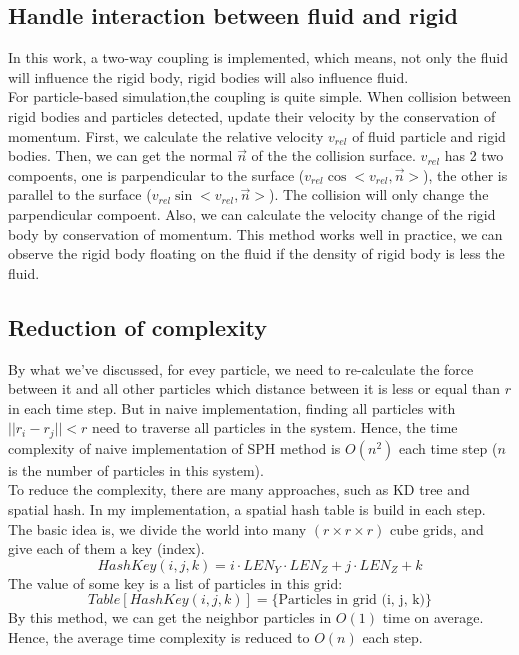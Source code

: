 \documentclass[acmtog]{acmart}
\begin{document}
\subsection{Handle interaction between fluid and rigid}
In this work, a two-way coupling is implemented, which means, not only the fluid will influence the 
rigid body, rigid bodies will also influence fluid. \\
For particle-based simulation,the coupling is quite simple. When collision between rigid bodies and 
particles detected, update their velocity by the conservation of momentum. First, we calculate the 
relative velocity $v_{rel}$ of fluid particle and rigid bodies. Then, we can get the normal $\vec{n}$ 
of the the collision surface. $v_{rel}$ has 2 two compoents, one is parpendicular to the surface 
($v_{rel}\cos<v_{rel}, \vec{n}>$), the other is parallel to the surface ($v_{rel}\sin<v_{rel}, \vec{n}>$). 
The collision will only change the parpendicular compoent. Also, we can calculate the velocity change 
of the rigid body by conservation of momentum. This method works well in practice, we can observe the 
rigid body floating on the fluid if the density of rigid body is less the fluid.

\subsection{Reduction of complexity}
By what we've discussed, for evey particle, we need to re-calculate the force between it and all 
other particles which distance between it is less or equal than $r$ in each time step. But in 
naive implementation, finding all particles with $||r_i - r_j|| < r$ need to traverse all particles 
in the system. Hence, the time complexity of naive implementation of SPH method is $O(n^2)$ each time step 
($n$ is the number of particles in this system).\\
To reduce the complexity, there are many approaches, such as KD tree and spatial hash. In my implementation, 
a spatial hash table is build in each step. The basic idea is, we divide the world into many 
$(r\times r \times r)$ cube grids, and give each of them a key (index). 
$$HashKey(i, j, k) = i \cdot LEN_Y \cdot LEN_Z + j \cdot LEN_Z + k$$
The value of some key is a list of particles in this grid:
$$Table[HashKey(i, j, k)] = \{\text{Particles in grid (i, j, k)} \}$$
By this method, we can get the neighbor particles in $O(1)$ time on average. Hence, the average 
time complexity is reduced to $O(n)$ each step.
\end{document}
